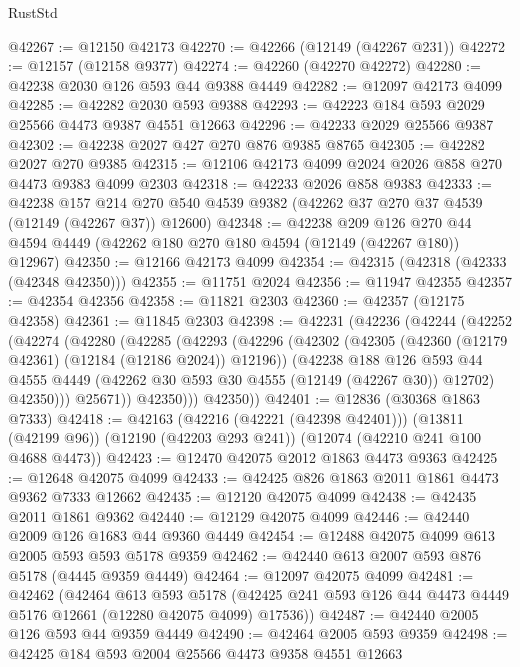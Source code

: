 \begin{lexlean}{RustStd}
\begin{coremodule}
@42267 := @12150 @42173
@42270 := @42266 (@12149 (@42267 @231))
@42272 := @12157 (@12158 @9377)
@42274 := @42260 (@42270 @42272)
@42280 := @42238 @2030 @126 @593 @44 @9388 @4449
@42282 := @12097 @42173 @4099
@42285 := @42282 @2030 @593 @9388
@42293 := @42223 @184 @593 @2029 @25566 @4473 @9387 @4551 @12663
@42296 := @42233 @2029 @25566 @9387
@42302 := @42238 @2027 @427 @270 @876 @9385 @8765
@42305 := @42282 @2027 @270 @9385
@42315 := @12106 @42173 @4099 @2024 @2026 @858 @270 @4473 @9383 @4099 @2303
@42318 := @42233 @2026 @858 @9383
@42333 := @42238
    @157
    @214
    @270
    @540
    @4539
    @9382
    (@42262 @37 @270 @37 @4539 (@12149 (@42267 @37)) @12600)
@42348 := @42238
    @209
    @126
    @270
    @44
    @4594
    @4449
    (@42262 @180 @270 @180 @4594 (@12149 (@42267 @180)) @12967)
@42350 := @12166 @42173 @4099
@42354 := @42315 (@42318 (@42333 (@42348 @42350)))
@42355 := @11751 @2024
@42356 := @11947 @42355
@42357 := @42354 @42356
@42358 := @11821 @2303
@42360 := @42357 (@12175 @42358)
@42361 := @11845 @2303
@42398 := @42231
    (@42236
      (@42244
        (@42252
          (@42274
            (@42280
              (@42285
                (@42293
                  (@42296
                    (@42302
                      (@42305 (@42360 (@12179 @42361) (@12184 (@12186 @2024)) @12196))
                      (@42238
                        @188
                        @126
                        @593
                        @44
                        @4555
                        @4449
                        (@42262 @30 @593 @30 @4555 (@12149 (@42267 @30)) @12702)
                        @42350)))
                  @25671))
              @42350)))
        @42350))
@42401 := @12836 (@30368 @1863 @7333)
@42418 := @42163
    (@42216 (@42221 (@42398 @42401)))
    (@13811 (@42199 @96))
    (@12190 (@42203 @293 @241))
    (@12074 (@42210 @241 @100 @4688 @4473))
@42423 := @12470 @42075 @2012 @1863 @4473 @9363
@42425 := @12648 @42075 @4099
@42433 := @42425 @826 @1863 @2011 @1861 @4473 @9362 @7333 @12662
@42435 := @12120 @42075 @4099
@42438 := @42435 @2011 @1861 @9362
@42440 := @12129 @42075 @4099
@42446 := @42440 @2009 @126 @1683 @44 @9360 @4449
@42454 := @12488 @42075 @4099 @613 @2005 @593 @593 @5178 @9359
@42462 := @42440 @613 @2007 @593 @876 @5178 (@4445 @9359 @4449)
@42464 := @12097 @42075 @4099
@42481 := @42462
    (@42464
      @613
      @593
      @5178
      (@42425 @241 @593 @126 @44 @4473 @4449 @5176 @12661 (@12280 @42075 @4099) @17536))
@42487 := @42440 @2005 @126 @593 @44 @9359 @4449
@42490 := @42464 @2005 @593 @9359
@42498 := @42425 @184 @593 @2004 @25566 @4473 @9358 @4551 @12663

\end{coremodule}
\end{lexlean}
